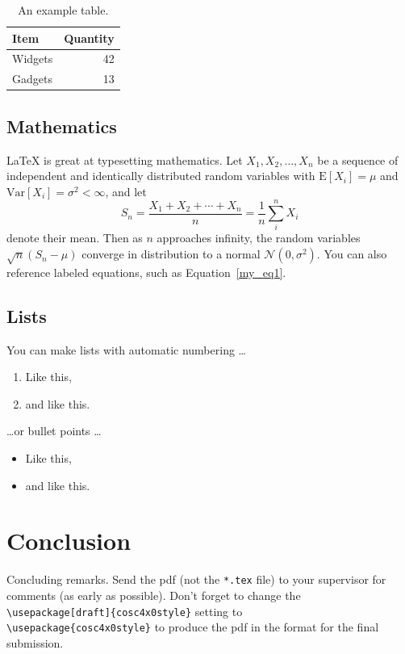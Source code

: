 \documentclass[12pt]{article}
\begin{document}
\begin{table}
\centering
\begin{tabular}{l|r}
Item & Quantity \\\hline
Widgets & 42 \\
Gadgets & 13
\end{tabular}
\caption{\label{tab:widgets}An example table.}
\end{table}

\subsection{Mathematics}

\LaTeX{} is great at typesetting mathematics. Let $X_1, X_2, \ldots, X_n$ be a sequence of independent and identically distributed random variables with $\text{E}[X_i] = \mu$ and $\text{Var}[X_i] = \sigma^2 < \infty$, and let
\begin{equation}S_n = \frac{X_1 + X_2 + \cdots + X_n}{n}
      = \frac{1}{n}\sum_{i}^{n} X_i\label{my_eq1}\end{equation}
denote their mean. Then as $n$ approaches infinity, the random variables $\sqrt{n}(S_n - \mu)$ converge in distribution to a normal $\mathcal{N}(0, \sigma^2)$. You can also reference labeled equations, such as Equation~\ref{my_eq1}.

\subsection{Lists}

You can make lists with automatic numbering \dots

\begin{enumerate}
\item Like this,
\item and like this.
\end{enumerate}
\dots or bullet points \dots
\begin{itemize}
\item Like this,
\item and like this.
\end{itemize}

\section{Conclusion}

Concluding remarks. Send the pdf (not the \verb$*.tex$ file) to your supervisor for comments (as early as possible). Don't forget to change the\\ \verb$\usepackage[draft]{cosc4x0style}$ setting to\\ \verb$\usepackage{cosc4x0style}$ to produce the pdf in the format for the final submission.
\end{document}
